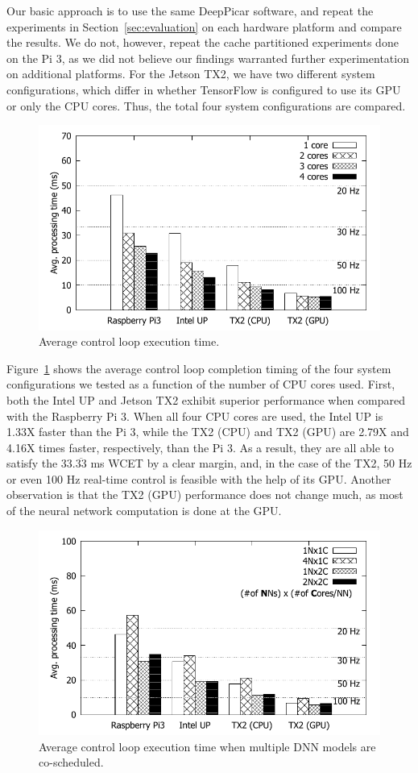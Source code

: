 Our basic approach is to use the same DeepPicar software, and repeat
the experiments in Section~\ref{sec:evaluation} on each hardware
platform and compare the results. We do not, however, repeat the cache
partitioned experiments done on the Pi 3, as we did not believe our 
findings warranted further experimentation on additional platforms. 
For the Jetson TX2, we have two different system configurations,
which differ in whether TensorFlow is configured to use its GPU or
only the CPU cores. Thus, the total four system configurations are
compared.

\begin{figure}[h]
  \centering
  \includegraphics[width=.7\textwidth]{figs/compare_core}
  \caption{Average control loop execution time.} 
  \label{fig:sys_core}
\end{figure}

Figure~\ref{fig:sys_core} shows the average control loop completion
timing of the four system configurations we tested as a function of
the number of CPU cores used.
First, both the Intel UP and Jetson TX2 exhibit superior performance when
compared with the Raspberry Pi 3. 
When all four CPU cores are used, the Intel UP is 1.33X faster than
the Pi 3, while the TX2 (CPU) and TX2 (GPU) are 2.79X and 4.16X times faster,
respectively, than the Pi 3. 
As a result, they are all able to satisfy the 33.$\overline{\mbox{33}}$ ms 
WCET by a clear margin,
and, in the case of the TX2, 50 Hz or even 100 Hz real-time control is
feasible with the help of its GPU. Another observation is that the TX2
(GPU) performance does not change much, as most of the neural network 
computation is done at the GPU.

\begin{figure}[h]
  \centering
  \includegraphics[width=.7\textwidth]{figs/compare_model}
  \caption{Average control loop execution time when multiple DNN
    models are co-scheduled. }
  \label{fig:sys_model}
\end{figure}

